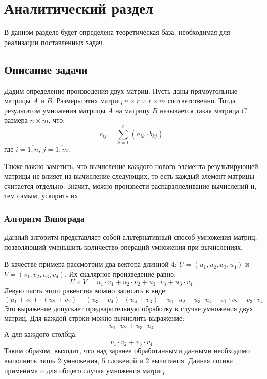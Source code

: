 \chapter{Аналитический раздел}
\label{cha:analysis}

В данном разделе будет определена теоретическая база, необходимая для реализации поставленных задач.

\section{Описание задачи}

Дадим определение произведения двух матриц. Пусть даны прямоугольные матрицы $A$ и $B$. Размеры этих матриц $n\times{}r$ и $r\times{}m$ соответственно. Тогда результатом умножения матрицы $A$ на матрицу $B$ называется такая матрица $C$ размера $n\times{}m$, что:
\begin{equation}
    c_{ij} = \sum\limits_{k=1}^r(a_{ik}\cdot{}b_{kj})
\end{equation}
где $i = \overline{1, n}$, $j = \overline{1, m}$.

Также важно заметить, что вычисление каждого нового элемента результирующей матрицы не влияет на вычисление следующих, то есть каждый элемент матрицы считается отдельно. Значит, можно произвести распараллеливание вычислений и, тем самым, ускорить их.

\subsection{Алгоритм Винограда}
Данный алгоритм представляет собой альтернативный способ умножения матриц, позволяющий уменьшить количество операций умножения при вычислениях.

В качестве примера рассмотрим два вектора длинной 4: $U = (u_1, u_2, u_3, u_4)$ и $V = (v_1, v_2, v_3, v_4)$. Их скалярное произведение равно:
\begin{equation}
    U\times{}V = u_1\cdot{}v_1 + u_2\cdot{}v_2 + u_3\cdot{}v_3 + u_3\cdot{}v_4
\end{equation}
Левую часть этого равенства можно записать в виде:
\begin{equation}
    (u_1 + v_2)\cdot{}(u_2 + v_1) + (u_3 + v_4)\cdot{}(u_4 + v_3) - u_1\cdot{}u_2 - u_3\cdot{}u_4 - v_1\cdot{}v_2 - v_3\cdot{}v_4
\end{equation}
Это выражение допускает предварительную обработку в случае умножения двух матриц. Для каждой строки можно вычислить выражение:
\begin{equation}
    u_1\cdot{}u_2 + u_3\cdot{}u_4
\end{equation}
А для каждого столбца:
\begin{equation}
    v_1\cdot{}v_2 + v_3\cdot{}v_4
\end{equation}
Таким образом, выходит, что над заранее обработанными данными необходимо выполнить лишь 2 умножения, 5 сложений и 2 вычитания. Данная логика применима и для общего случая умножения матриц.

